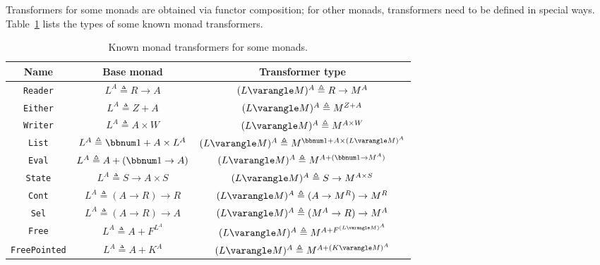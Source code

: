 Transformers for some monads are obtained via functor composition;
for other monads, transformers need to be defined in special ways.
Table~\ref{tab:Known-monad-transformers} lists the types of some
known monad transformers.
\begin{table}
\begin{centering}
\begin{tabular}{|c|c|c|}
\hline 
\textbf{\small{}Name} & \textbf{\small{}Base monad} & \textbf{\small{}Transformer type}\tabularnewline
\hline 
\hline 
{\small{}}\lstinline!Reader! & {\small{}$L^{A}\triangleq R\rightarrow A$} & {\small{}$(L\varangle M)^{A}\triangleq R\rightarrow M^{A}$}\tabularnewline
\hline 
{\small{}}\lstinline!Either! & {\small{}$L^{A}\triangleq Z+A$} & {\small{}$(L\varangle M)^{A}\triangleq M^{Z+A}$}\tabularnewline
\hline 
{\small{}}\lstinline!Writer! & {\small{}$L^{A}\triangleq A\times W$} & {\small{}$(L\varangle M)^{A}\triangleq M^{A\times W}$}\tabularnewline
\hline 
{\small{}}\lstinline!List! & {\small{}$L^{A}\triangleq\bbnum 1+A\times L^{A}$} & {\small{}$(L\varangle M)^{A}\triangleq M^{\bbnum 1+A\times(L\varangle M)^{A}}$}\tabularnewline
\hline 
{\small{}}\lstinline!Eval! & {\small{}$L^{A}\triangleq A+\left(\bbnum 1\rightarrow A\right)$} & {\small{}$(L\varangle M)^{A}\triangleq M^{A+(\bbnum 1\rightarrow M^{A})}$}\tabularnewline
\hline 
{\small{}}\lstinline!State! & {\small{}$L^{A}\triangleq S\rightarrow A\times S$} & {\small{}$(L\varangle M)^{A}\triangleq S\rightarrow M^{A\times S}$}\tabularnewline
\hline 
{\small{}}\lstinline!Cont! & {\small{}$L^{A}\triangleq\left(A\rightarrow R\right)\rightarrow R$} & {\small{}$(L\varangle M)^{A}\triangleq(A\rightarrow M^{R})\rightarrow M^{R}$}\tabularnewline
\hline 
{\small{}}\lstinline!Sel! & {\small{}$L^{A}\triangleq\left(A\rightarrow R\right)\rightarrow A$} & {\small{}$(L\varangle M)^{A}\triangleq(M^{A}\rightarrow R)\rightarrow M^{A}$}\tabularnewline
\hline 
{\small{}}\lstinline!Free! & {\small{}$L^{A}\triangleq A+F^{L^{A}}$} & {\small{}$(L\varangle M)^{A}\triangleq M^{A+F^{(L\varangle M)^{A}}}$}\tabularnewline
\hline 
{\small{}}\lstinline!FreePointed! & {\small{}$L^{A}\triangleq A+K^{A}$} & {\small{}$(L\varangle M)^{A}\triangleq M^{A+(K\varangle M)^{A}}$}\tabularnewline
\hline 
\end{tabular}
\par\end{centering}
\caption{\label{tab:Known-monad-transformers}Known monad transformers for
some monads.}

\end{table}

